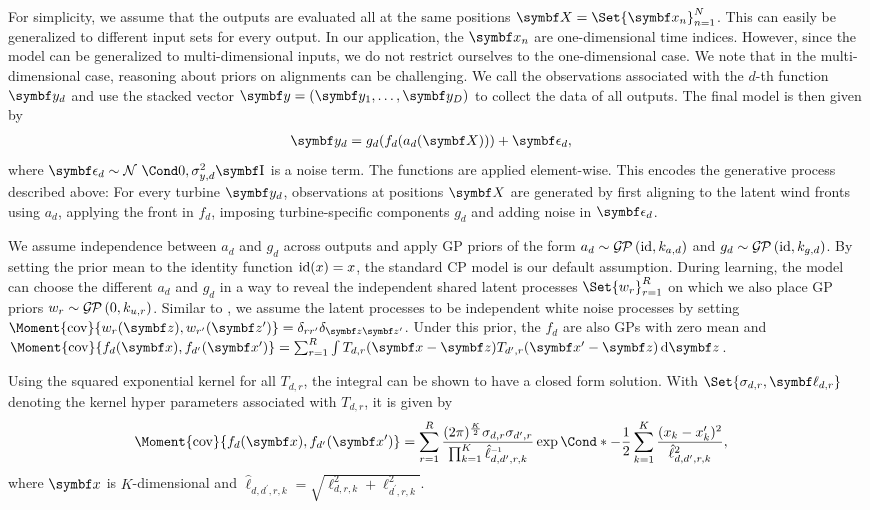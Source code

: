 For simplicity, we assume that the outputs are evaluated all at the same positions $\mat{X} = \Set{\mat{x_n}}_{n=1}^N$.
This can easily be generalized to different input sets for every output.
In our application, the $\mat{x_n}$ are one-dimensional time indices.
However, since the model can be generalized to multi-dimensional inputs, we do not restrict ourselves to the one-dimensional case.
We note that in the multi-dimensional case, reasoning about priors on alignments can be challenging.
We call the observations associated with the $d$-th function $\mat{y_d}$ and use the stacked vector $\mat{y} = \left( \mat{y_1}, \dots, \mat{y_D} \right)$ to collect the data of all outputs.
The final model is then given by
\begin{align}
    \mat{y_d} & = g_d(f_d(a_d(\mat{X}))) + \mat{\epsilon_d},
\end{align}
where $\mat{\epsilon_d} \sim \Gaussian{0, \sigma_{y, d}^2\Eye}$ is a noise term.
The functions are applied element-wise.
This encodes the generative process described above:
For every turbine $\rv{y_d}$, observations at positions $\rv{X}$ are generated by first aligning to the latent wind fronts using $a_d$, applying the front in $f_d$, imposing turbine-specific components $g_d$ and adding noise in $\rv{\epsilon_d}$.

We assume independence between $a_d$ and $g_d$ across outputs and apply GP priors of the form $a_d \sim \operatorname{\mathcal{G\mkern-1mu P}\mkern3mu}(\operatorname{id}, k_{a, d})$ and $g_d \sim \operatorname{\mathcal{G\mkern-1mu P}\mkern3mu}(\operatorname{id}, k_{g, d})$.
By setting the prior mean to the identity function $\operatorname{id}(x) = x$, the standard CP model is our default assumption.
During learning, the model can choose the different $a_d$ and $g_d$ in a way to reveal the independent shared latent processes $\Set{w_r}_{r=1}^R$ on which we also place GP priors $w_r \sim \operatorname{\mathcal{G\mkern-1mu P}\mkern3mu}(0, k_{u, r})$.
Similar to \textcite{boyle_dependent_2004}, we assume the latent processes to be independent white noise processes by setting $\Moment{\cov}{w_r(\mat{z}), w_{r^\prime}(\mat{z^\prime})} = \delta_{rr^\prime}\delta_{\mat{z}\mat{z^\prime}}$.
Under this prior, the $f_d$ are also GPs with zero mean and $\Moment{\cov}{f_d(\mat{x}), f_{d^\prime}(\mat{x^\prime})} = \sum_{r=1}^R \int T_{d,r}(\mat{x} - \mat{z}) T_{d^\prime,r}(\mat{x^\prime} - \mat{z}) \diff \mat{z}$.

Using the squared exponential kernel for all $T_{d, r}$, the integral can be shown to have a closed form solution.
With $\Set{\sigma_{d,r}, \mat{\ell_{d, r}}}$ denoting the kernel hyper parameters associated with $T_{d,r}$, it is given by
\begin{align}
    \label{eq:alignment:dependent_kernel}
    \begin{split}
        \MoveEqLeft[1] \Moment{\cov}{f_d(\mat{x}), f_{d^\prime}(\mat{x^\prime})} = \sum_{r=1}^R \frac{(2\pi)^{\frac{K}{2}}\sigma_{d, r}\sigma_{d^\prime, r}}{\prod_{k=1}^K \hat{\ell}_{d, d^\prime, r, k}\inv} \Fun*{\exp}{-\frac{1}{2} \sum_{k=1}^K \frac{(x_k - x^\prime_k)^2}{\hat{\ell}_{d, d^\prime, r, k}^2}},
    \end{split}
\end{align}
where $\mat{x}$ is $K$-dimensional and $\hat{\ell}_{d, d^\prime, r, k} = \sqrt{\ell_{d, r, k}^2 + \ell_{d^\prime, r, k}^2}$.

